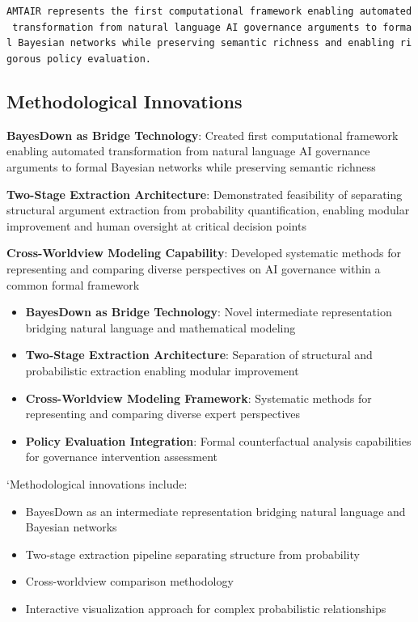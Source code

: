 \documentclass[
  11pt,
  letterpaper,
]{book}
\providecommand{\tightlist}{%
  \setlength{\itemsep}{0pt}\setlength{\parskip}{0pt}}
\begin{document}
\texttt{AMTAIR\ represents\ the\ first\ computational\ framework\ enabling\ automated\ transformation\ from\ natural\ language\ AI\ governance\ arguments\ to\ formal\ Bayesian\ networks\ while\ preserving\ semantic\ richness\ and\ enabling\ rigorous\ policy\ evaluation.}

\subsection{Methodological
Innovations}\label{sec-methodological-innovations}

\textbf{BayesDown as Bridge Technology}: Created first computational
framework enabling automated transformation from natural language AI
governance arguments to formal Bayesian networks while preserving
semantic richness

\textbf{Two-Stage Extraction Architecture}: Demonstrated feasibility of
separating structural argument extraction from probability
quantification, enabling modular improvement and human oversight at
critical decision points

\textbf{Cross-Worldview Modeling Capability}: Developed systematic
methods for representing and comparing diverse perspectives on AI
governance within a common formal framework

\begin{itemize}
\tightlist
\item
  \textbf{BayesDown as Bridge Technology}: Novel intermediate
  representation bridging natural language and mathematical modeling
\item
  \textbf{Two-Stage Extraction Architecture}: Separation of structural
  and probabilistic extraction enabling modular improvement
\item
  \textbf{Cross-Worldview Modeling Framework}: Systematic methods for
  representing and comparing diverse expert perspectives
\item
  \textbf{Policy Evaluation Integration}: Formal counterfactual analysis
  capabilities for governance intervention assessment
\end{itemize}

`Methodological innovations include:

\begin{itemize}
\tightlist
\item
  BayesDown as an intermediate representation bridging natural language
  and Bayesian networks
\item
  Two-stage extraction pipeline separating structure from probability
\item
  Cross-worldview comparison methodology
\item
  Interactive visualization approach for complex probabilistic
  relationships
\end{itemize}
\end{document}
